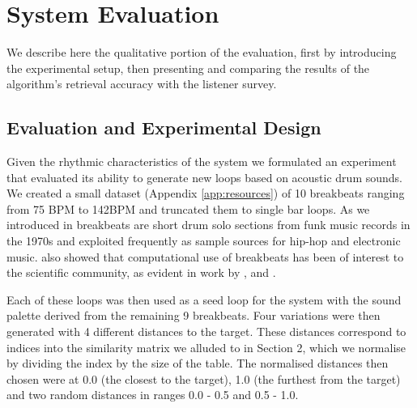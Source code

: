 
\section{System Evaluation}

We describe here the qualitative portion of the evaluation, first by introducing the experimental setup, then presenting and comparing the results of the algorithm’s retrieval accuracy with the listener survey.

\subsection{Evaluation and Experimental Design}

Given the rhythmic characteristics of the system we formulated an experiment that evaluated its ability to generate new loops based on acoustic drum sounds. We created a small dataset (Appendix \ref{app:resources}) of 10 breakbeats ranging from 75 BPM to 142BPM and truncated them to single bar loops. As we introduced in  breakbeats are short drum solo sections from funk music records in the 1970s and exploited frequently as sample sources for hip-hop and electronic music.  also showed that computational use of breakbeats has been of interest to the scientific community, as evident in work by \cite{Ravelli2007}, \cite{Hockman2015} and \cite{Collins2006}.

Each of these loops was then used as a seed loop for the system with the sound palette derived from the remaining 9 breakbeats. Four variations were then generated with 4 different distances to the target.  These distances correspond to indices into the similarity matrix we alluded to in Section 2, which we normalise by dividing the index by the size of the table. The normalised distances then chosen were at 0.0 (the closest to the target), 1.0 (the furthest from the target) and two random distances in ranges 0.0 - 0.5 and 0.5 - 1.0.


